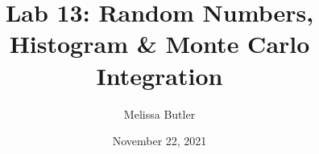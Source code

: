 \title{Lab 13: Random Numbers, Histogram \& Monte Carlo Integration}
\author{Melissa Butler}
\date{November 22, 2021}